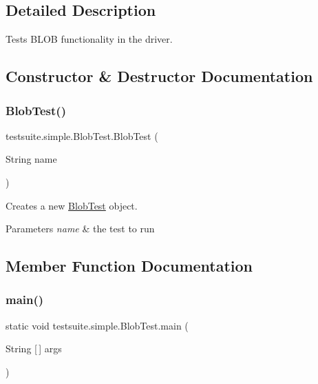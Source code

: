 \subsection{Detailed Description}
Tests B\+L\+OB functionality in the driver. 

\subsection{Constructor \& Destructor Documentation}
\mbox{\label{classtestsuite_1_1simple_1_1_blob_test_a2741df6da9d07c3c6b8ba36abf15bc86}} 
\subsubsection{\texorpdfstring{Blob\+Test()}{BlobTest()}}
{\footnotesize\ttfamily testsuite.\+simple.\+Blob\+Test.\+Blob\+Test (\begin{DoxyParamCaption}\item[{String}]{name }\end{DoxyParamCaption})}

Creates a new \mbox{\hyperlink{classtestsuite_1_1simple_1_1_blob_test}{Blob\+Test}} object.


\begin{DoxyParams}{Parameters}
{\em name} & the test to run \\
\hline
\end{DoxyParams}


\subsection{Member Function Documentation}
\mbox{\label{classtestsuite_1_1simple_1_1_blob_test_afda9a3e28dbbf808702dcf118e046ec6}} 
\subsubsection{\texorpdfstring{main()}{main()}}
{\footnotesize\ttfamily static void testsuite.\+simple.\+Blob\+Test.\+main (\begin{DoxyParamCaption}\item[{String \mbox{[}$\,$\mbox{]}}]{args }\end{DoxyParamCaption})\hspace{0.3cm}{\ttfamily [static]}}

